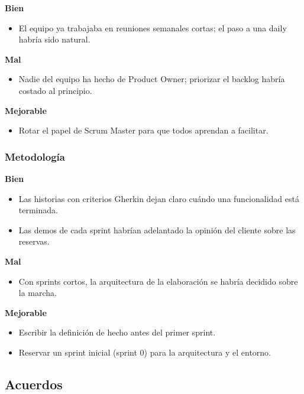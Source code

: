\documentclass[11pt,a4paper]{article}
\begin{document}
\textbf{Bien}

\begin{itemize}
\item El equipo ya trabajaba en reuniones semanales cortas; el paso a una daily habría sido natural.
\end{itemize}

\textbf{Mal}

\begin{itemize}
\item Nadie del equipo ha hecho de Product Owner; priorizar el backlog habría costado al principio.
\end{itemize}

\textbf{Mejorable}

\begin{itemize}
\item Rotar el papel de Scrum Master para que todos aprendan a facilitar.
\end{itemize}

\subsubsection*{Metodología}

\textbf{Bien}

\begin{itemize}
\item Las historias con criterios Gherkin dejan claro cuándo una funcionalidad está terminada.
\item Las demos de cada sprint habrían adelantado la opinión del cliente sobre las reservas.
\end{itemize}

\textbf{Mal}

\begin{itemize}
\item Con sprints cortos, la arquitectura de la elaboración se habría decidido sobre la marcha.
\end{itemize}

\textbf{Mejorable}

\begin{itemize}
\item Escribir la definición de hecho antes del primer sprint.
\item Reservar un sprint inicial (sprint 0) para la arquitectura y el entorno.
\end{itemize}

\subsection*{Acuerdos}
\end{document}
